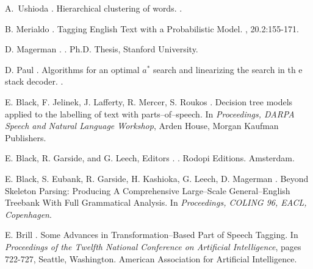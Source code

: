 \begin{thebibliography}{99}

A.~Ushioda \BBCP.
\newblock Hierarchical clustering of words.
.

B. Merialdo \BBCP.
\newblock Tagging English Text with a Probabilistic Model.
, 20.2:155-171.

D. Magerman \BBCP.
.
\newblock Ph.D. Thesis, Stanford University.

D. Paul \BBCP.
\newblock Algorithms for an optimal $a^*$ search and linearizing the search in th
e stack decoder.
.

E. Black, F. Jelinek, J. Lafferty, R. Mercer, S. Roukos \BBCP.
\newblock Decision tree models applied to the labelling of text with parts--of--speech.
\newblock In {\em Proceedings, DARPA Speech and Natural Language Workshop}, Arden House, Morgan Kaufman Publishers.

E. Black, R. Garside, and G. Leech, Editors \BBCP.
.
\newblock Rodopi Editions.
\newblock Amsterdam.

E. Black, S. Eubank, R. Garside, H. Kashioka, G. Leech, D. Magerman \BBCP.
\newblock Beyond Skeleton Parsing: Producing A Comprehensive Large--Scale General--English Treebank With Full Grammatical Analysis.
\newblock In {\em Proceedings, COLING 96, EACL, Copenhagen}.

E. Brill \BBCP.
\newblock Some Advances in Transformation--Based Part of Speech Tagging.
\newblock In {\em Proceedings of the Twelfth National Conference on Artificial Intelligence}, pages 722-727, Seattle, Washington. American Association for Artificial Intelligence.


\end{thebibliography}
